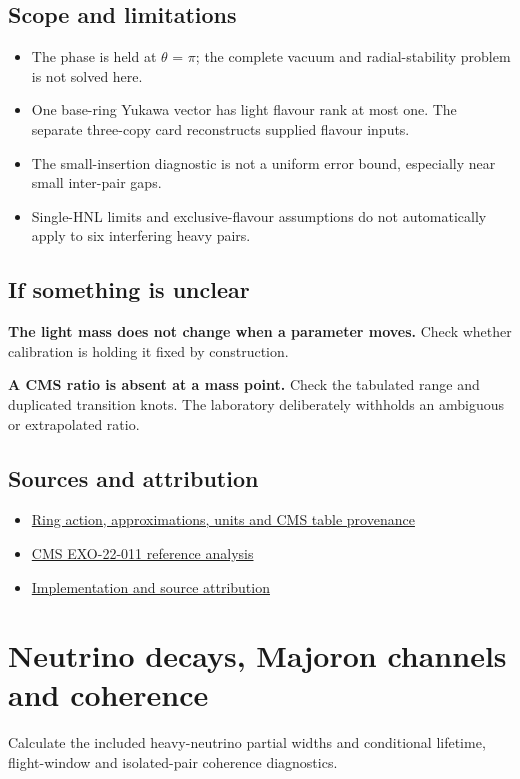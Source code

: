 \documentclass[11pt,a4paper]{article}
\begin{document}
\subsection*{Scope and limitations}
\begin{itemize}
\item The phase is held at \ensuremath{\theta} = \ensuremath{\pi}; the complete vacuum and radial-stability problem is not solved here.
\item One base-ring Yukawa vector has light flavour rank at most one. The separate three-copy card reconstructs supplied flavour inputs.
\item The small-insertion diagnostic is not a uniform error bound, especially near small inter-pair gaps.
\item Single-HNL limits and exclusive-flavour assumptions do not automatically apply to six interfering heavy pairs.
\end{itemize}
\subsection*{If something is unclear}
\textbf{The light mass does not change when a parameter moves.} Check whether calibration is holding it fixed by construction.

\textbf{A CMS ratio is absent at a mass point.} Check the tabulated range and duplicated transition knots. The laboratory deliberately withholds an ambiguous or extrapolated ratio.

\subsection*{Sources and attribution}
\begin{itemize}
\item \href{https://github.com/karlesmarin/ghu-lab/blob/main/docs/neutrino-ring.md}{Ring action, approximations, units and CMS table provenance}
\item \href{https://cms-results.web.cern.ch/cms-results/public-results/publications/EXO-22-011/}{CMS EXO-22-011 reference analysis}
\item \href{https://github.com/karlesmarin/ghu-lab/blob/main/src/modules/neutrino_ring.mjs}{Implementation and source attribution}
\end{itemize}
\section{Neutrino decays, Majoron channels and coherence}
Calculate the included heavy-neutrino partial widths and conditional lifetime, flight-window and isolated-pair coherence diagnostics.
\end{document}
